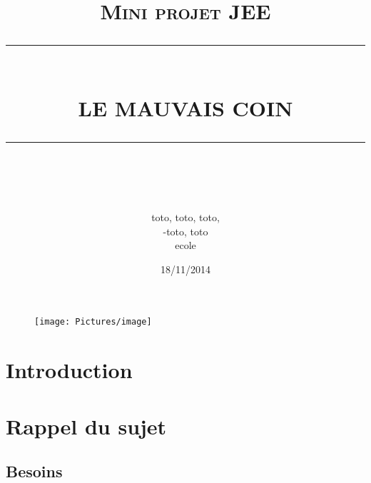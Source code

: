 \documentclass[12pt]{report}
\newcommand{\HRule}[1]{\rule{\linewidth}{#1}}
\begin{document}
\vspace{-12pt}
\begin{figure}
	 \begin{center}
		\texttt{[image: Pictures/image]}
	 \end{center}
\end{figure}

\title{  \textsc{Mini projet JEE}
		\HRule{0.5pt} \\
		\LARGE \textbf{\uppercase{Le Mauvais Coin}}
		\HRule{2pt} \\ [1.5cm]
		\normalsize \vspace*{1\baselineskip}}
		
\date{18/11/2014}

 

\author{
		 toto,  toto,  toto, \\
         -toto,  toto \\   
        ecole }
                

\maketitle
\tableofcontents
\newpage

\sectionfont{\scshape}

\section{Introduction}
\vspace{1cm}

\newpage
\section{Rappel du sujet}

\subsection{Besoins}
\end{document}
